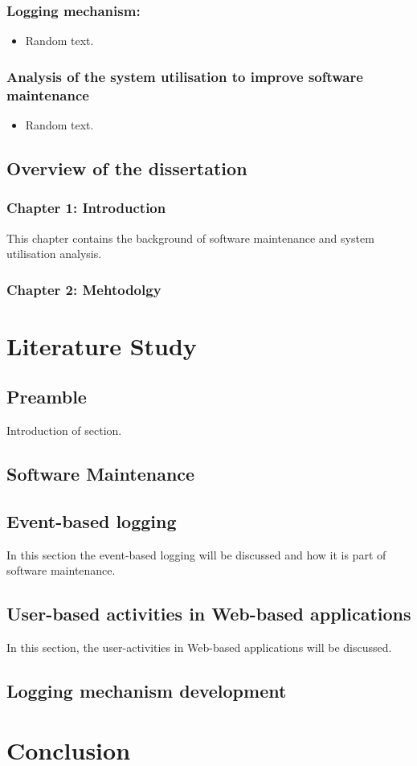 \subsubsection{Logging mechanism:}
\begin{itemize}
    \item Random text.
\end{itemize}

\subsubsection{Analysis of the system utilisation to improve software maintenance}
\begin{itemize}
    \item Random text.
\end{itemize}

\subsection{Overview of the dissertation}
\subsubsection{Chapter 1: Introduction}
This chapter contains the background of software maintenance and system
utilisation analysis.
\subsubsection{Chapter 2: Mehtodolgy}

\newpage
\section{Literature Study}

\subsection{Preamble}
Introduction of section.

\subsection{Software Maintenance}

\subsection{Event-based logging}
In this section the event-based logging will be discussed and how it is part of software maintenance. 

\subsection{User-based activities in Web-based applications}
In this section, the user-activities in Web-based applications will be discussed.

\subsection{Logging mechanism development}

\section{Conclusion}

